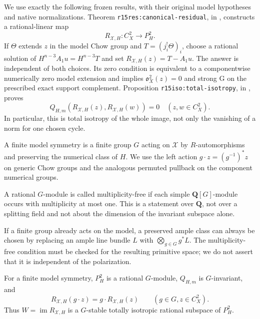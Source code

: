 We use exactly the following frozen results, with their original
model hypotheses and native normalizations.
Theorem \texttt{r15res:canonical-residual}, in
,
constructs a rational-linear map
\[
                    R_{\mathcal X,H}:C_X^2\longrightarrow P_H^2.
\tag{ER16.3}\label{r16sym:residual-map}
\]
If $\Theta$ extends $z$ in the model Chow group and
$T=(j_i^!\Theta)_i$, choose a rational solution of
$H^{n-3}A_1u=H^{n-3}T$ and set
$R_{\mathcal X,H}(z)=T-A_1u$.  The answer is independent
of both choices.  Its zero condition is equivalent to a
componentwise numerically zero model extension and implies
$\mathfrak o_X^2(z)=0$ and strong G on the prescribed exact
support complement.  Proposition \texttt{r15iso:total-isotropy},
in ,
proves
\[
             Q_{H,m}(R_{\mathcal X,H}(z),R_{\mathcal X,H}(w))=0
                      \quad(z,w\in C_X^2).
\tag{ER16.4}\label{r16sym:frozen-isotropy}
\]
In particular, this is total isotropy of the whole image, not
only the vanishing of a norm for one chosen cycle.

\begin{definition}
\label{r16sym:datum}
A finite model symmetry is a finite group $G$ acting on
$\mathcal X$ by $R$-automorphisms and preserving the numerical
class of $H$.  We use the left action
$g\cdot z=(g^{-1})^*z$ on generic Chow groups and the analogous
permuted pullback on the component numerical groups.

A rational $G$-module is called multiplicity-free if each
simple $\mathbf Q[G]$-module occurs with multiplicity at most
one.  This is a statement over $\mathbf Q$, not over a
splitting field and not about the dimension of the invariant
subspace alone.
\end{definition}

If a finite group already acts on the model, a preserved ample
class can always be chosen by replacing an ample line bundle
$L$ with $\bigotimes_{g\in G}g^*L$.  The multiplicity-free
condition must be checked for the resulting primitive space;
we do not assert that it is independent of the polarization.

\begin{lemma}
\label{r16sym:equivariance}
For a finite model symmetry, $P_H^2$ is a rational
$G$-module, $Q_{H,m}$ is $G$-invariant, and
\[
                  R_{\mathcal X,H}(g\cdot z)
                         =g\cdot R_{\mathcal X,H}(z)
                         \qquad(g\in G, z\in C_X^2).
\tag{ER16.5}\label{r16sym:equivariance-formula}
\]
Thus $W=\operatorname{im}R_{\mathcal X,H}$ is a
$G$-stable totally isotropic rational subspace of $P_H^2$.
\end{lemma}

